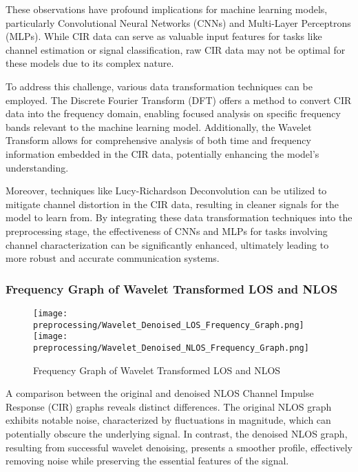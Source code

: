 These observations have profound implications for machine learning models, particularly Convolutional Neural Networks (CNNs) and Multi-Layer Perceptrons (MLPs). While CIR data can serve as valuable input features for tasks like channel estimation or signal classification, raw CIR data may not be optimal for these models due to its complex nature.

To address this challenge, various data transformation techniques can be employed. The Discrete Fourier Transform (DFT) offers a method to convert CIR data into the frequency domain, enabling focused analysis on specific frequency bands relevant to the machine learning model. Additionally, the Wavelet Transform allows for comprehensive analysis of both time and frequency information embedded in the CIR data, potentially enhancing the model's understanding.

Moreover, techniques like Lucy-Richardson Deconvolution can be utilized to mitigate channel distortion in the CIR data, resulting in cleaner signals for the model to learn from. By integrating these data transformation techniques into the preprocessing stage, the effectiveness of CNNs and MLPs for tasks involving channel characterization can be significantly enhanced, ultimately leading to more robust and accurate communication systems.



\subsubsection{Frequency Graph of Wavelet Transformed LOS and NLOS}\label{frequency_graph_wavelet}

\begin{figure}[H] 
  \centering
  \texttt{[image: preprocessing/Wavelet\_Denoised\_LOS\_Frequency\_Graph.png]}
  \texttt{[image: preprocessing/Wavelet\_Denoised\_NLOS\_Frequency\_Graph.png]}
  \caption{Frequency Graph of Wavelet Transformed LOS and NLOS}\label{fig:frequency_graph_wavelet}
\end{figure}

A comparison between the original and denoised NLOS Channel Impulse Response (CIR) graphs reveals distinct differences. The original NLOS graph exhibits notable noise, characterized by fluctuations in magnitude, which can potentially obscure the underlying signal. In contrast, the denoised NLOS graph, resulting from successful wavelet denoising, presents a smoother profile, effectively removing noise while preserving the essential features of the signal.


